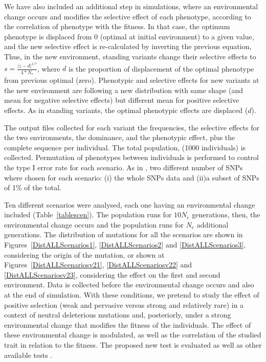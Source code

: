 \documentclass[a4paper,11pt]{article}
\begin{document}
We have also included an additional step in simulations, where an environmental change occurs and modifies the selective effect of each phenotype, according to the correlation of phenotype with the fitness. In that case, the optimum phenotype is displaced from 0 (optimal at initial environment) to a given value, and the new selective effect is re-calculated by inverting the previous equation, Thus, in the new environment, standing variants change their selective effects to $s=\frac{|z-d|^{1/\tau}}{4*N_e}$, where $d$ is the proportion of displacement of the optimal phenotype from previous optimal (zero). Phenotypic and selective effects for new variants at the new environment are following a new distribution with same shape (and mean for negative selective effects) but different mean for positive selective effects. As in standing variants, the optimal phenotypic effects are displaced ($d$). %

The output files collected  for each variant the frequencies, the selective effects for the two environments, the dominance, and the phenotypic effect, plus the complete sequence per individual. The total population, (1000 individuals) is collected. 
Permutation of phenotypes between individuals is performed to control the type I error rate for each scenario. As in \citep{Caballero:2015aa}, two different number of SNPs where chosen for each scenario: (i) the whole SNPs data and (ii)a subset of SNPs of 1\% of the total.

Ten different scenarios were analysed, each one having an environmental change included (Table~\ref{tablescen}). The population runs for $10 N_e$ generations, then, the environmental change occurs and the population runs for $N_e$ additional generations. The distribution of mutations for all the scenarios are shown in Figures~\ref{DistALLScenarios1}, \ref{DistALLScenarios2} and \ref{DistALLScenarios3}, considering the origin of the mutation, or shown at Figures~\ref{DistALLScenariosv21}, \ref{DistALLScenariosv22} and \ref{DistALLScenariosv23}, considering the effect on the first and second environment. Data is collected before the environmental change occurs and also at the end of simulation. With these conditions, we pretend to study the effect of positive selection (weak and pervasive versus strong and relatively rare) in a context of neutral deleterious mutations and, posteriorly, under a strong environmental change that modifies the fitness of the individuals. The effect of these environmental change is modulated, as well as the correlation of the studied trait in relation to the fitness. The proposed new test is evaluated as well as other available tests  \citep{Beissinger:2018aa,Uricchio:2019aa}.
 
\end{document}
